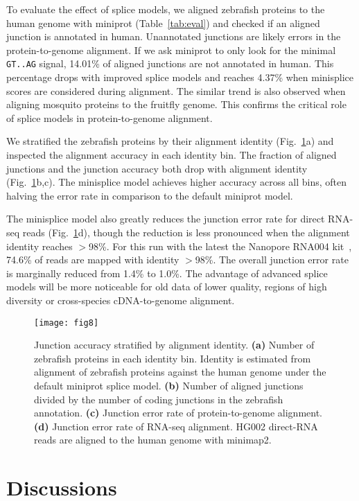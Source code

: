 \documentclass[webpdf,contemporary,large,namedate]{oup-authoring-template}%
\begin{document}
To evaluate the effect of splice models,
we aligned zebrafish proteins to the human genome with miniprot (Table~\ref{tab:eval})
and checked if an aligned junction is annotated in human.
Unannotated junctions are likely errors in the protein-to-genome alignment.
If we ask miniprot to only look for the minimal {\tt GT..AG} signal, 14.01\% of aligned junctions are not annotated in human.
This percentage drops with improved splice models
and reaches 4.37\% when minisplice scores are considered during alignment.
The similar trend is also observed when aligning mosquito proteins to the fruitfly genome.
This confirms the critical role of splice models in protein-to-genome alignment.

We stratified the zebrafish proteins by their alignment identity (Fig.~\ref{fig:map}a)
and inspected the alignment accuracy in each identity bin.
The fraction of aligned junctions and the junction accuracy both drop with alignment identity (Fig.~\ref{fig:map}b,c).
The minisplice model achieves higher accuracy across all bins, often halving the error rate in comparison to the default miniprot model.

The minisplice model also greatly reduces the junction error rate for direct RNA-seq reads (Fig.~\ref{fig:map}d),
though the reduction is less pronounced when the alignment identity reaches $>$98\%.
For this run with the latest the Nanopore RNA004 kit~\citep{Zheng2024.11.17.624050}, 74.6\% of reads are mapped with identity $>$98\%.
The overall junction error rate is marginally reduced from 1.4\% to 1.0\%.
The advantage of advanced splice models will be more noticeable for old data of lower quality, regions of high diversity or cross-species cDNA-to-genome alignment.

\begin{figure}[bt]
\texttt{[image: fig8]}
\caption{Junction accuracy stratified by alignment identity.
{\bf (a)} Number of zebrafish proteins in each identity bin.
Identity is estimated from alignment of zebrafish proteins against the human genome under the default miniprot splice model.
{\bf (b)} Number of aligned junctions divided by the number of coding junctions in the zebrafish annotation.
{\bf (c)} Junction error rate of protein-to-genome alignment.
{\bf (d)} Junction error rate of RNA-seq alignment.
HG002 direct-RNA reads are aligned to the human genome with minimap2.}\label{fig:map}
\end{figure}

\section{Discussions}
\end{document}
